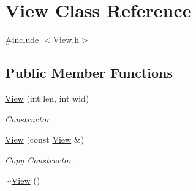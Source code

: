 \hypertarget{classView}{\section{View Class Reference}
\label{classView}
}


{\ttfamily \#include $<$View.\-h$>$}

\subsection*{Public Member Functions}
\begin{DoxyCompactItemize}
\item 
\hyperlink{classView_aac96eba98e7f531e94ad15a892e19dbd}{View} (int len, int wid)
\begin{DoxyCompactList}\small\item\em Constructor. \end{DoxyCompactList}\item 
\hypertarget{classView_aa373ca7c069a854e1e8821b0f13aa186}{\hyperlink{classView_aa373ca7c069a854e1e8821b0f13aa186}{View} (const \hyperlink{classView}{View} \&)}\label{classView_aa373ca7c069a854e1e8821b0f13aa186}

\begin{DoxyCompactList}\small\item\em Copy Constructor. \end{DoxyCompactList}\item 
\hypertarget{classView_ad0dc854db9aabbea98a334dec89f785c}{\hyperlink{classView_ad0dc854db9aabbea98a334dec89f785c}{$\sim$\-View} ()}\label{classView_ad0dc854db9aabbea98a334dec89f785c}


\end{DoxyCompactItemize}
